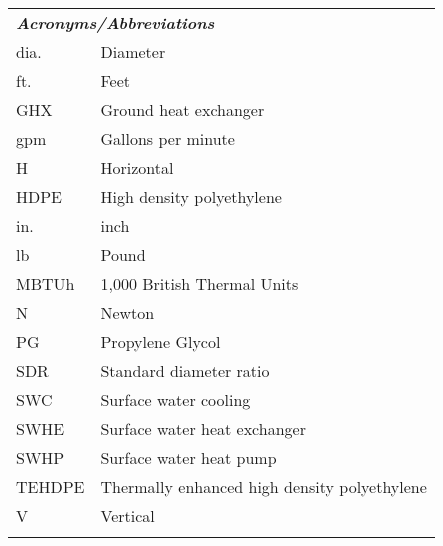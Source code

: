 \begin{nomenclature}
\setcounter{page}{\value{placeholder}}

	\renewcommand{\arraystretch}{0.55}
	\begin{tabular}{p{2cm} p{12cm}}
		\multicolumn{2}{l}{\textbf{\textit{Acronyms/Abbreviations}}} \\
		dia. \dotfill & Diameter\\
		ft.\ \dotfill & Feet \\
		GHX \dotfill & Ground heat exchanger\\
		gpm \dotfill & Gallons per minute \\
		H \dotfill & Horizontal\\
		HDPE \dotfill & High density polyethylene \\
		in.\ \dotfill & inch \\
		lb \dotfill & Pound\\
		MBTUh \dotfill & 1,000 British Thermal Units \\
		N \dotfill & Newton\\
		PG \dotfill & Propylene Glycol \\
		SDR \dotfill & Standard diameter ratio \\
		SWC \dotfill & Surface water cooling\\
		SWHE \dotfill & Surface water heat exchanger\\
		SWHP \dotfill & Surface water heat pump\\
		TEHDPE \dotfill & Thermally enhanced high density polyethylene\\
		V \dotfill & Vertical\\
		
		& \\


\end{tabular}
\end{nomenclature}
